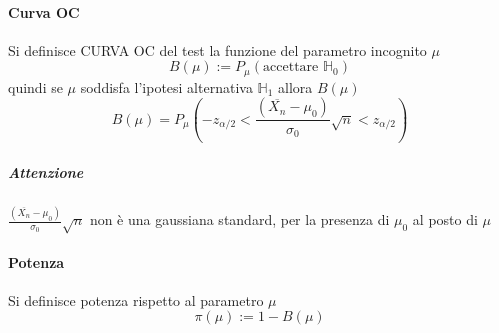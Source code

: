 \documentclass{article}
\begin{document}
	\paragraph{Curva OC}
	Si definisce CURVA OC del test la funzione del parametro incognito $\mu$
	\begin{equation*}
		B(\mu):=P_\mu(\text{accettare }\mathbb{H}_0)
	\end{equation*}
	quindi se $\mu$ soddisfa l'ipotesi alternativa $\mathbb{H}_1$ allora $B(\mu)$
	\begin{equation*}
		B(\mu) = P_\mu\left(-z_{\alpha/2} < \frac{(\overline{X_n}-\mu_0)}{\sigma_0}\sqrt{n} < z_{\alpha/2}\right)
	\end{equation*}
	\subparagraph{Attenzione}
	$\frac{(\overline{X_n}-\mu_0)}{\sigma_0}\sqrt{n}$ non è una gaussiana standard, per la presenza di $\mu_0$ al posto di $\mu$
	\paragraph{Potenza}
	Si definisce potenza rispetto al parametro $\mu$
	\begin{equation*}
		\pi(\mu):=1-B(\mu)
	\end{equation*}
\end{document}
